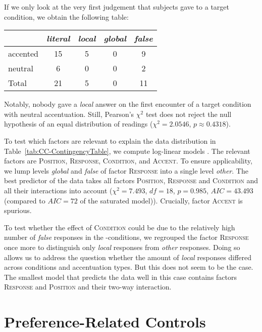 \documentclass[fleqn,reqno,10pt]{article}
\renewcommand{\es}{\acro{es}}
\begin{document}
If we only look at the very first judgement that subjects gave to a
target condition, we obtain the following table:
\begin{center}
\begin{tabular}{lcccc}
    & \emph{literal} & \emph{local} & \emph{global} & \emph{false} \\
    \midrule
    accented & 15 &  5 & 0 &  9 \\
    neutral  &  6 &  0 & 0 &  2 \\ \addlinespace[0.15cm]
    Total    & 21 &  5 & 0 & 11
\end{tabular}
\end{center}
Notably, nobody gave a \emph{local} answer on the first encounter of a
target condition with neutral accentuation. Still, Pearson's $\chi^2$
test does not reject the null hypothesis of an equal distribution
of readings ($\chi^2 = 2.0546$, $p \approx 0.4318$).

To test which factors are relevant to explain the data distribution in
Table~\ref{tab:CC-ContingencyTable}, we compute log-linear models
\citep{KnokeBurke1980:Log-Linear-Mode}. The relevant factors are
\textsc{Position}, \textsc{Response}, \textsc{Condition}, and
\textsc{Accent}. To ensure applicability, we lump levels \emph{global}
and \emph{false} of factor \textsc{Response} into a single level
\emph{other}. The best predictor of the data takes all factors
\textsc{Position}, \textsc{Response} and \textsc{Condition} and all
their interactions into account ($\chi^2 = 7.493$, $df=18$, $p =
0.985$, $AIC = 43.493$ (compared to $AIC=72$ of the saturated
model)). Crucially, factor \textsc{Accent} is spurious.

To test whether the effect of \textsc{Condition} could be due to the
relatively high number of \emph{false} responses in the
\es-conditions, we regrouped the factor \textsc{Response} once more to
distinguish only \emph{local} responses from \emph{other}
responses. Doing so allows us to address the question whether the
amount of \emph{local} responses differed across conditions and
accentuation types. But this does not seem to be the case. The
smallest model that predicts the data well in this case contains
factors \textsc{Response} and \textsc{Position} and their two-way
interaction. 



\section{Preference-Related Controls}
\label{sec:pref-relat-contr}




\printbibliography[heading=bibintoc]
\end{document}
